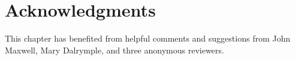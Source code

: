 \documentclass[output=paper,hidelinks]{langscibook}
\begin{document}
\section*{Acknowledgments}

This chapter has benefited from helpful comments and suggestions from John Maxwell, Mary Dalrymple, and three anonymous reviewers.

\sloppy
\printbibliography[heading=subbibliography,notkeyword=this]
\end{document}
